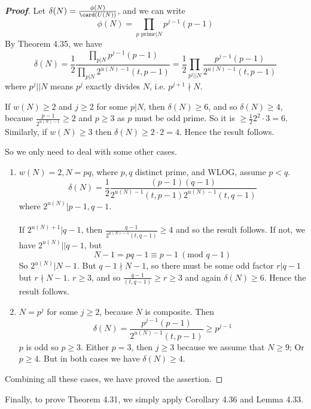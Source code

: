 \begin{proof}[\bf Proof] Let $\delta(N)=\frac{\phi(N)}{\card(U(N))}$, and we can write
$$\phi(N)=\prod_{p \text{ prime}|N}p^{j-1}(p-1)$$
By Theorem 4.35, we have
$$\delta(N)=\frac{1}{2} \frac{\prod_{p|N}p^{j-1}(p-1)}{\prod_{p|N}2^{u(N)-1}(t,p-1)}
=\frac{1}{2}\prod_{p^j||N}\frac{p^{j-1}(p-1)}{2^{u(N)-1}(t,p-1)}$$
where $p^j||N$ means $p^j$ exactly divides $N$, i.e. $p^{j+1} \nmid N$.

If $w(N) \ge 2$ and $j \ge 2$ for some $p|N$, then $\delta(N) \ge 6$, and so $\delta(N) \ge 4$, because
$\frac{p-1}{2^{u(N)-1}} \ge 2$ and $p \ge 3$ as $p$ must be odd prime.
So it is $\ge \frac{1}{2} 2^2 \cdot 3 =6$. Similarly, if $w(N) \ge 3$ then $\delta(N) \ge 2 \cdot 2 =4$.
Hence the result follows.

So we only need to deal with some other cases.
\begin{enumerate}
\item $w(N)=2,N=pq$, where $p,q$ distinct prime, and WLOG, assume $p<q$.
$$\delta(N)=\frac{1}{2} \frac{(p-1)(q-1)}{2^{u(N)-1}(t,p-1)2^{u(N)-1}(t,q-1)}$$
where $2^{u(N)}|p-1,q-1$. \\
~\\
If $2^{u(N)+1}|q-1$, then $\frac{q-1}{2^{u(N)-1}(t,q-1)} \ge 4$ and so the result follows.
If not, we have $2^{u(N)}||q-1$, but $$N-1=pq-1 \equiv p-1~(\text{mod } q-1)$$ So $2^{u(N)}|N-1$.
But $q-1 \nmid N-1$, so there must be some odd factor $r |q-1$ but $r \nmid N-1$. $r \ge 3$, and so
$\frac{q-1}{(t,q-1)} \ge r \ge 3$ and again $\delta(N) \ge 6$. Hence the result follows.\\
\item $N=p^j$ for some $j \ge 2$, because $N$ is composite. Then
$$\delta(N)=\frac{p^{j-1}(p-1)}{2^{u(N)-1}(t,p-1)} \ge p^{j-1}$$
$p$ is odd so $p \ge 3$. Either $p=3$, then $j \ge 3$ because we assume that $N \ge 9$; Or $p \ge 4$. But in both cases we have $\delta(N) \ge 4$.
\end{enumerate}
Combining all these cases, we have proved the assertion.
\end{proof}
Finally, to prove Theorem 4.31, we simply apply Corollary 4.36 and Lemma 4.33.
